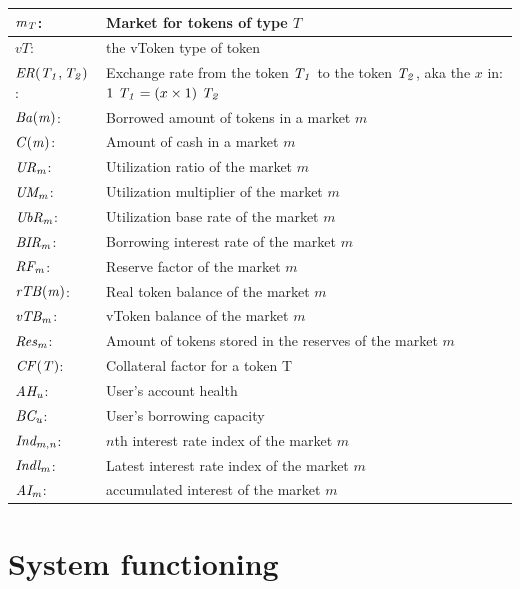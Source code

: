 \begin{tabularx}{\linewidth}{|l X|}\hline
  $\mathit{m_{T}}$: & Market for tokens of type $T$ \\\hline
  $vT$: & the vToken type of token \\\hline
  
  $\mathit{ER(\mathit{T_{1}}, \mathit{T_{2}})}$: & Exchange rate from the token $\mathit{T_{1}}$ to the token $\mathit{T_{2}}$, aka the $x$ in: $1\ \T{1} = (x \times 1)\ \T{2}$ \\\hline
  
  $\mathit{Ba(m)}$: & Borrowed amount of tokens in a market $m$ \\\hline
  $\mathit{C(m)}$: & Amount of cash in a market $m$ \\\hline

  $\mathit{UR_{m}}$: & Utilization ratio of the market $m$ \\\hline
  $\mathit{UM_{m}}$: & Utilization multiplier of the market $m$ \\\hline
  $\mathit{UbR_{m}}$: & Utilization base rate of the market $m$ \\\hline
  $\mathit{BIR_{m}}$: & Borrowing interest rate of the market $m$ \\\hline
  $\mathit{RF_{m}}$: & Reserve factor of the market $m$ \\\hline

  $\mathit{rTB(m)}$: & Real token balance of the market $m$ \\\hline 
  $\mathit{vTB_{m}}$: & vToken balance of the market $m$ \\\hline 
  $\mathit{Res_{m}}$: & Amount of tokens stored in the reserves of the market $m$ \\\hline
  
  $\mathit{CF(T)}$: & Collateral factor for a token T \\\hline
  $\mathit{AH_{u}}$: & User's account health \\\hline
  $\mathit{BC_{u}}$: & User's borrowing capacity \\\hline
  
  $\mathit{Ind_{m, n}}$: & $n$th interest rate index of the market $m$ \\\hline
  $\mathit{Indl_{m}}$: & Latest interest rate index of the market $m$ \\\hline
  $\mathit{AI_{m}}$: & accumulated interest of the market $m$ \\\hline

\end{tabularx}
\newpage
\section{System functioning}

